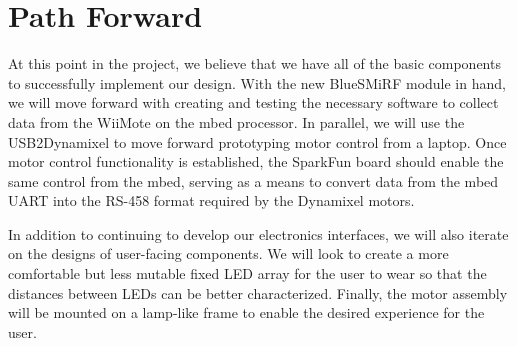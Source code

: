 \documentclass[conference, twocolumn]{IEEEtran}
\begin{document}
\section{Path Forward}
At this point in the project, we believe that we have all of the basic components to successfully implement our design. With the new BlueSMiRF module in hand,  we will move forward with creating and testing the necessary software to collect data from the WiiMote on the mbed processor. In parallel, we will use the USB2Dynamixel to move forward prototyping motor control from a laptop. Once motor control functionality is established, the SparkFun board should enable the same control from the mbed, serving as a means to convert data from the mbed UART into the RS-458 format required by the Dynamixel motors.

In addition to continuing to develop our electronics interfaces, we will also iterate on the designs of user-facing components. We will look to create a more comfortable but less mutable fixed LED array for the user to wear so that the distances between LEDs can be better characterized. Finally, the motor assembly will be mounted on a lamp-like frame to enable the desired experience for the user.

% 
%
%
%


%
%
\end{document}
